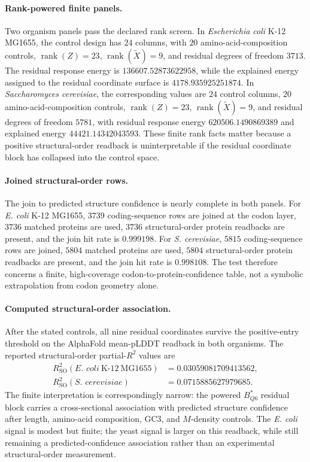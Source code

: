 \paragraph{Rank-powered finite panels.}
Two organism panels pass the declared rank screen. In \emph{Escherichia coli} K-12 MG1655, the control design has $24$ columns, with $20$ amino-acid-composition controls, $\operatorname{rank}(Z)=23$, $\operatorname{rank}(\widetilde X)=9$, and residual degrees of freedom $3713$. The residual response energy is $136607.52873622958$, while the explained energy assigned to the residual coordinate surface is $4178.935925251874$. In \emph{Saccharomyces cerevisiae}, the corresponding values are $24$ control columns, $20$ amino-acid-composition controls, $\operatorname{rank}(Z)=23$, $\operatorname{rank}(\widetilde X)=9$, and residual degrees of freedom $5781$, with residual response energy $620506.1490869389$ and explained energy $44421.14342043593$. These finite rank facts matter because a positive structural-order readback is uninterpretable if the residual coordinate block has collapsed into the control space.

\paragraph{Joined structural-order rows.}
The join to predicted structure confidence is nearly complete in both panels. For \emph{E. coli} K-12 MG1655, $3739$ coding-sequence rows are joined at the codon layer, $3736$ matched proteins are used, $3736$ structural-order protein readbacks are present, and the join hit rate is $0.999198$. For \emph{S. cerevisiae}, $5815$ coding-sequence rows are joined, $5804$ matched proteins are used, $5804$ structural-order protein readbacks are present, and the join hit rate is $0.998108$. The test therefore concerns a finite, high-coverage codon-to-protein-confidence table, not a symbolic extrapolation from codon geometry alone.

\paragraph{Computed structural-order association.}
After the stated controls, all nine residual coordinates survive the positive-entry threshold on the AlphaFold mean-pLDDT readback in both organisms. The reported structural-order partial-$R^{2}$ values are
$$
\begin{aligned}
R^{2}_{\mathrm{SO}}(\textit{E. coli}\ \mathrm{K\text{-}12\ MG1655}) &= 0.03059081709413562,\\
R^{2}_{\mathrm{SO}}(\textit{S. cerevisiae}) &= 0.0715885627979685.
\end{aligned}
$$
The finite interpretation is correspondingly narrow: the powered $B^{\ast}_{Q6}$ residual block carries a cross-sectional association with predicted structure confidence after length, amino-acid composition, GC3, and $M$-density controls. The \emph{E. coli} signal is modest but finite; the yeast signal is larger on this readback, while still remaining a predicted-confidence association rather than an experimental structural-order measurement.

